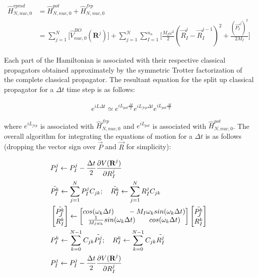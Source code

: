 \begin{align}
\label{QNMD-6}
    \hat{H}^{rpmd}_{N,nuc,0}&=\hat{H}^{pot}_{N,nuc,0}+\hat{H}^{frp}_{N,nuc,0}\\
                             &=\sum_{j=1}^{N}  \bigg[\hat{V}^{BO}_{nuc,0}(\textbf{R}^{j})\bigg] + \sum_{j=1}^{N} \sum_{I=1}^{n_n} \bigg[\frac{M_I\omega^2}{2}(\vec{R}^{j}_{I}-\vec{R}^{j-1}_{I})^2 + \frac{(\vec{P_I}^j)^2}{2M_I}\bigg]
\end{align}

\noindent Each part of the Hamiltonian is associated with their respective classical propagators obtained approximately by the symmetric Trotter factorization of the complete classical propagator. The resultant equation for the split up classical propagator for a $\Delta t$ time step is as follows:

\begin{align}
\label{QNMD-66}
    &e^{iL\Delta t}\simeq e^{iL_{pot}\frac{\Delta t}{2}}e^{iL_{frp}\Delta t}e^{iL_{pot}\frac{\Delta t}{2}}
\end{align}

\noindent where $e^{iL_{frp}}$ is associated with $\hat{H}^{frp}_{N,nuc,0}$ and $e^{iL_{pot}}$ is associated with $\hat{H}^{pot}_{N,nuc,0}$. The overall algorithm\cite{ceriotti2010efficient} for integrating the equations of motion for a $\Delta t$ is as follows (dropping the vector sign over $\vec{P}$ and $\vec{R}$ for simplicity):

\begin{align}
    &P_I^{j} \leftarrow P_I^{j} - \frac{\Delta t}{2}\frac{\partial V(\textbf{R}^j)}{\partial R_I^j}\label{QNMD-71}\\
    &\Tilde{P_I^{k}} \leftarrow \sum_{j=1}^{N}P_I^{j}C_{jk};\quad \Tilde{R_I^{k}} \leftarrow \sum_{j=1}^{N}R_I^{j}C_{jk} \label{QNMD-72}\\
    &\begin{bmatrix}
        \Tilde{P_I^{k}} \\ \Tilde{R_I^{k}} 
    \end{bmatrix}
    \leftarrow\begin{bmatrix}
        cos (\omega_{k}\Delta t) \quad \quad -M_I \omega_{k} sin (\omega_{k}\Delta t) \\
        \frac{1}{M_I\omega_{k}}sin (\omega_{k}\Delta t) \quad \quad cos (\omega_{k}\Delta t)
    \end{bmatrix}
    \begin{bmatrix}
        \Tilde{P_I^{k}} \\ \Tilde{R_I^{k}} 
    \end{bmatrix}\label{QNMD-73}\\
        &P_I^{k} \leftarrow \sum_{k=0}^{N-1}C_{jk}\Tilde{P_I^{j}};\quad R_I^{k} \leftarrow \sum_{k=0}^{N-1}C_{jk}\Tilde{R_I^{j}} \label{QNMD-74}\\
    &P_I^{j} \leftarrow P_I^{j} - \frac{\Delta t}{2}\frac{\partial V(\textbf{R}^j)}{\partial R_{I}^{j}}\label{QNMD-75}
\end{align}

